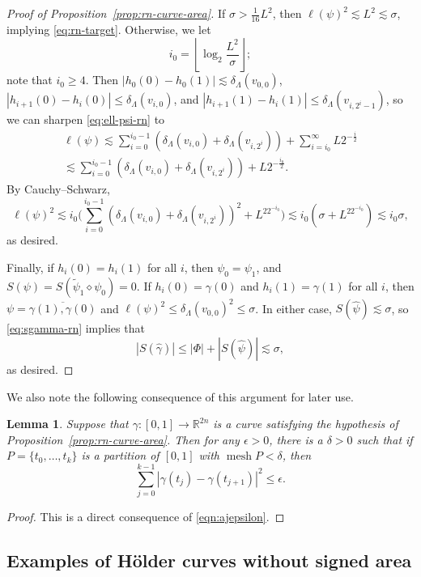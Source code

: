 \documentclass[12pt,reqno]{amsart}
\DeclareMathOperator{\mesh}{mesh}
\newcommand{\R}{\mathbb{R}}
\newcommand{\from}{\colon}
\newtheorem{lemma}[thm]{Lemma}
\theoremstyle{remark}
\newcommand{\0}{\mathbf{0}}
\renewcommand{\1}{\mathbf 1}
\begin{document}
\begin{proof}[Proof of Proposition~\ref{prop:rn-curve-area}]
  If $\sigma > \frac{1}{16} L^2$, then $\ell(\psi)^2 \lesssim L^2 \lesssim \sigma$, implying \eqref{eq:rn-target}. Otherwise, we let
  $$i_0=\left\lfloor \log_2 \frac{L^2}{\sigma}\right\rfloor;$$
  note that $i_0 \ge 4$.  Then $|h_0(0)-h_0(1)| \lesssim \delta_{\Lambda}(v_{0,0})$, $|h_{i+1}(0)-h_i(0)|\le \delta_{\Lambda}(v_{i,0})$, and $|h_{i+1}(1)-h_i(1)|\le \delta_{\Lambda}(v_{i,2^i-1})$, so we can sharpen \eqref{eq:ell-psi-rn} to
  \begin{multline*}
    \ell(\psi) \lesssim \sum_{i=0}^{i_0-1} \left(\delta_\Lambda(v_{i,0}) + \delta_\Lambda(v_{i,2^i})\right) + \sum_{i=i_0}^{\infty} L2^{-\frac{i}{2}}\\
    \lesssim \sum_{i=0}^{i_0-1} \left(\delta_\Lambda(v_{i,0}) + \delta_\Lambda(v_{i,2^i})\right) + L2^{-\frac{i_0}{2}}.
  \end{multline*}
  By Cauchy--Schwarz,
  $$\ell(\psi)^2 \lesssim i_0 \bigg(\sum_{i=0}^{i_0-1} \left(\delta_\Lambda(v_{i,0}) + \delta_\Lambda(v_{i,2^i})\right)^2 + L^22^{-i_0}\bigg) \lesssim
  i_0 (\sigma + L^22^{-i_0}) \lesssim i_0 \sigma,$$
  as desired.

  Finally, if $h_i(0)=h_i(1)$ for all $i$, then $\psi_0 = \psi_1$, and $S(\psi) = S(\tilde{\psi}_1 \diamond \psi_0) = 0$. If $h_i(0) = \gamma(0)$ and $h_i(1) = \gamma(1)$ for all $i$, then $\psi = \overline{\gamma(1),\gamma(0)}$ and $\ell(\psi)^2 \le \delta_\Lambda(v_{0,0})^2 \le \sigma$. In either case, $S(\hat{\psi})\lesssim \sigma$, so \eqref{eq:sgamma-rn} implies that
  $$|S(\hat\gamma)| \le |\Phi| + |S(\hat\psi)| \lesssim \sigma,$$
  as desired.
\end{proof}

We also note the following consequence of this argument for later use.
\begin{lemma}\label{lem:sq-partition}
  Suppose that $\gamma\from [0,1]\to \R^{2n}$ is a curve satisfying the hypothesis of  Proposition~\ref{prop:rn-curve-area}. Then for any $\epsilon>0$, there is a $\delta>0$ such that if $P=\{t_0,\dots, t_k\}$ is a partition of $[0,1]$ with $\mesh P < \delta$, then
  $$\sum_{j=0}^{k-1} |\gamma(t_j)-\gamma(t_{j+1})|^2\leq \epsilon.$$
\end{lemma}
\begin{proof}
  This is a direct consequence of \eqref{eqn:ajepsilon}.
\end{proof}

\subsection{Examples of Hölder curves without signed area}\label{sec:examples}
\end{document}
